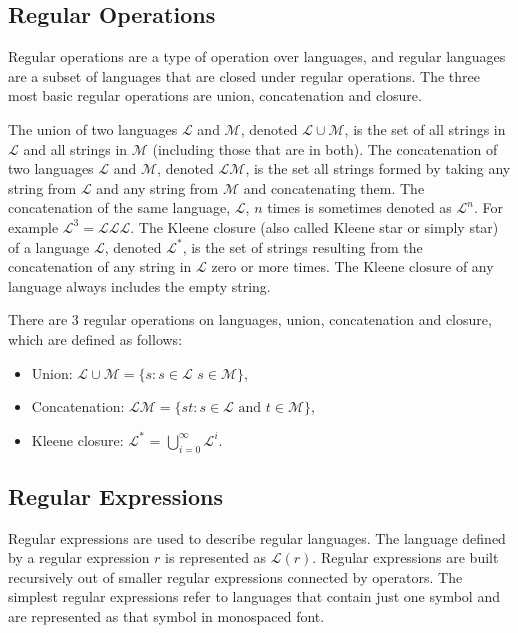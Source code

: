 \subsection{Regular Operations}
Regular operations are a type of operation over languages, and regular languages are a subset of languages that are closed under regular operations. The three most basic regular operations are union, concatenation and closure.

The union of two languages \(\mathcal{L}\) and \(\mathcal{M}\), denoted \(\mathcal{L} \cup \mathcal{M}\), is the set of all strings in \(\mathcal{L}\) and all strings in \(\mathcal{M}\) (including those that are in both).
The concatenation of two languages \(\mathcal{L}\) and \(\mathcal{M}\), denoted \(\mathcal{L}\mathcal{M}\), is the set all strings formed by taking any string from \(\mathcal{L}\) and any string from \(\mathcal{M}\) and concatenating them. The concatenation of the same language, \(\mathcal{L}\), \(n\) times is sometimes denoted as \(\mathcal{L}^n\). For example  \(\mathcal{L}^3 = \mathcal{L}\mathcal{L}\mathcal{L}\).
The Kleene closure\footnotemark{} (also called Kleene star or simply star) of a language \(\mathcal{L}\), denoted \(\mathcal{L}^*\), is the set of strings resulting from the concatenation of any string in \(\mathcal{L}\) zero or more times. The Kleene closure of any language always includes the empty string.

\begin{definition} There are 3 regular operations on languages, union, concatenation and closure, which are defined as follows:
\begin{itemize}
\item Union: \(\mathcal{L} \cup \mathcal{M} = \{s :s \in \mathcal{L}\)  \(s \in \mathcal{M}\}\),

\item Concatenation: \(\mathcal{L}\mathcal{M} =\{st : s \in \mathcal{L} \text{ and } t \in \mathcal{M}\}\),

\item Kleene closure: \(\mathcal{L}^*\) = \(\bigcup_{i=0}^\infty \mathcal{L}^i\).
\end{itemize}
\end{definition}

\subsection{Regular Expressions} \label{sec:regex}
Regular expressions are used to describe regular languages. The language defined by a regular expression \(r\) is represented as \(\mathcal{L}(r)\).
Regular expressions are built recursively out of smaller regular expressions connected by operators. The simplest regular expressions refer to languages that contain just one symbol and are represented as that symbol in monospaced font.

